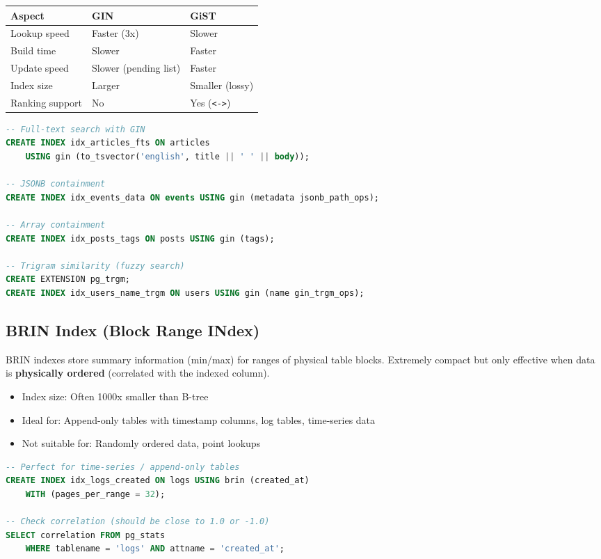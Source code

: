 \documentclass[12pt,a4paper]{article}
\begin{document}
\begin{infobox}
\begin{tabular}{lll}
\toprule
\textbf{Aspect} & \textbf{GIN} & \textbf{GiST} \\
\midrule
Lookup speed & Faster (3x) & Slower \\
Build time & Slower & Faster \\
Update speed & Slower (pending list) & Faster \\
Index size & Larger & Smaller (lossy) \\
Ranking support & No & Yes (\texttt{<->}) \\
\bottomrule
\end{tabular}
\end{infobox}

\begin{lstlisting}[language=SQL, caption={GIN index examples}]
-- Full-text search with GIN
CREATE INDEX idx_articles_fts ON articles
    USING gin (to_tsvector('english', title || ' ' || body));

-- JSONB containment
CREATE INDEX idx_events_data ON events USING gin (metadata jsonb_path_ops);

-- Array containment
CREATE INDEX idx_posts_tags ON posts USING gin (tags);

-- Trigram similarity (fuzzy search)
CREATE EXTENSION pg_trgm;
CREATE INDEX idx_users_name_trgm ON users USING gin (name gin_trgm_ops);
\end{lstlisting}

\subsection{BRIN Index (Block Range INdex)}

BRIN indexes store summary information (min/max) for ranges of physical table blocks. Extremely compact but only effective when data is \textbf{physically ordered} (correlated with the indexed column).

\begin{itemize}
    \item Index size: Often 1000x smaller than B-tree
    \item Ideal for: Append-only tables with timestamp columns, log tables, time-series data
    \item Not suitable for: Randomly ordered data, point lookups
\end{itemize}

\begin{lstlisting}[language=SQL, caption={BRIN index}]
-- Perfect for time-series / append-only tables
CREATE INDEX idx_logs_created ON logs USING brin (created_at)
    WITH (pages_per_range = 32);

-- Check correlation (should be close to 1.0 or -1.0)
SELECT correlation FROM pg_stats
    WHERE tablename = 'logs' AND attname = 'created_at';
\end{lstlisting}
\end{document}
